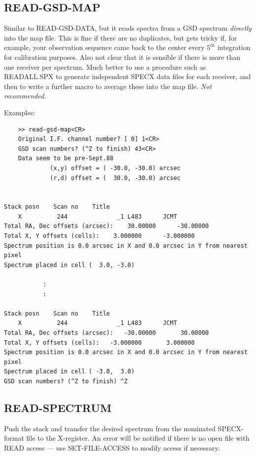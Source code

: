 \documentclass[11pt,twoside]{report}
\begin{document}
\subsection{READ-GSD-MAP} 

Similar to READ-GSD-DATA, but it reads spectra from a GSD spectrum 
{\em directly} into the map file. This is fine if there are no duplicates,
but gets tricky if, for example, your observation sequence came back to the
center every $5^{th}$ integration for calibration purposes. Also not clear
that it is sensible if there is more than one receiver per spectrum. Much
better to use a procedure such as READALL.SPX to generate independent SPECX
data files for each receiver, and then to write a further macro to average
these into the map file. {\em Not recommended.}

Examples:
\begin{verbatim}
    >> read-gsd-map<CR>
    Original I.F. channel number? [ 0] 1<CR>
    GSD scan numbers? (^Z to finish) 43<CR>
    Data seem to be pre-Sept.88
             (x,y) offset = ( -30.0, -30.0) arcsec
             (r,d) offset = (  30.0, -30.0) arcsec


Stack posn    Scan no    Title
    X          244              _1 L483      JCMT 
Total RA, Dec offsets (arcsec):    30.00000      -30.00000    
Total X, Y offsets (cells):    3.000000      -3.000000    
Spectrum position is 0.0 arcsec in X and 0.0 arcsec in Y from nearest pixel
Spectrum placed in cell (  3.0, -3.0) 

           :
           :

Stack posn    Scan no    Title
    X          244              _1 L483      JCMT 
Total RA, Dec offsets (arcsec):   -30.00000       30.00000    
Total X, Y offsets (cells):   -3.000000       3.000000    
Spectrum position is 0.0 arcsec in X and 0.0 arcsec in Y from nearest pixel
Spectrum placed in cell ( -3.0,  3.0) 
GSD scan numbers? (^Z to finish) ^Z
\end{verbatim}

\subsection{READ-SPECTRUM} 

Push the stack and transfer the desired spectrum from the nominated
SPECX-format file to the X-register. An error will be notified if there is no
open file with READ access --- use SET-FILE-ACCESS to modify access if
 necessary. 
\end{document}
